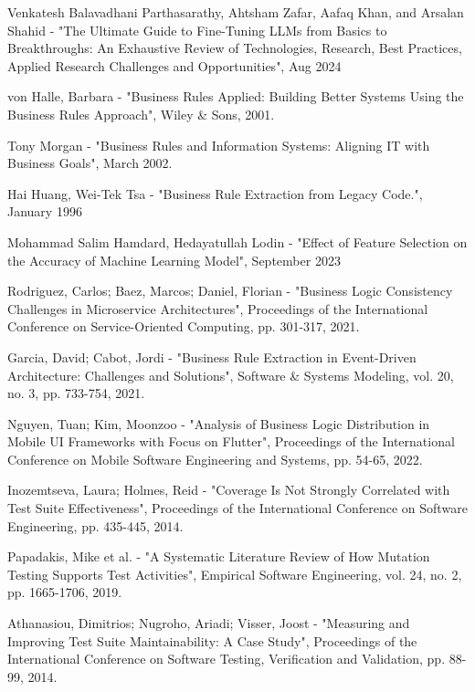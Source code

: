 \documentclass[12pt, twoside]{report}
\begin{document}
\begin{thebibliography}{99}
Venkatesh Balavadhani Parthasarathy, Ahtsham Zafar, Aafaq Khan, and Arsalan Shahid - "The Ultimate Guide to Fine-Tuning LLMs from Basics to Breakthroughs: An Exhaustive Review of Technologies, Research, Best Practices, Applied Research Challenges and Opportunities", Aug 2024

von Halle, Barbara - "Business Rules Applied: Building Better Systems Using the Business Rules Approach", Wiley \& Sons, 2001.

Tony Morgan - "Business Rules and Information Systems: Aligning IT with Business Goals", March 2002.

Hai Huang, Wei-Tek Tsa - "Business Rule Extraction from Legacy Code.", January 1996

Mohammad Salim Hamdard, Hedayatullah Lodin - "Effect of Feature Selection on the Accuracy of Machine Learning Model", September 2023

Rodriguez, Carlos; Baez, Marcos; Daniel, Florian - "Business Logic Consistency Challenges in Microservice Architectures", Proceedings of the International Conference on Service-Oriented Computing, pp. 301-317, 2021.

Garcia, David; Cabot, Jordi - "Business Rule Extraction in Event-Driven Architecture: Challenges and Solutions", Software \& Systems Modeling, vol. 20, no. 3, pp. 733-754, 2021.

Nguyen, Tuan; Kim, Moonzoo - "Analysis of Business Logic Distribution in Mobile UI Frameworks with Focus on Flutter", Proceedings of the International Conference on Mobile Software Engineering and Systems, pp. 54-65, 2022.

Inozemtseva, Laura; Holmes, Reid - "Coverage Is Not Strongly Correlated with Test Suite Effectiveness", Proceedings of the International Conference on Software Engineering, pp. 435-445, 2014.

Papadakis, Mike et al. - "A Systematic Literature Review of How Mutation Testing Supports Test Activities", Empirical Software Engineering, vol. 24, no. 2, pp. 1665-1706, 2019.

Athanasiou, Dimitrios; Nugroho, Ariadi; Visser, Joost - "Measuring and Improving Test Suite Maintainability: A Case Study", Proceedings of the International Conference on Software Testing, Verification and Validation, pp. 88-99, 2014.


\end{thebibliography}
\end{document}
